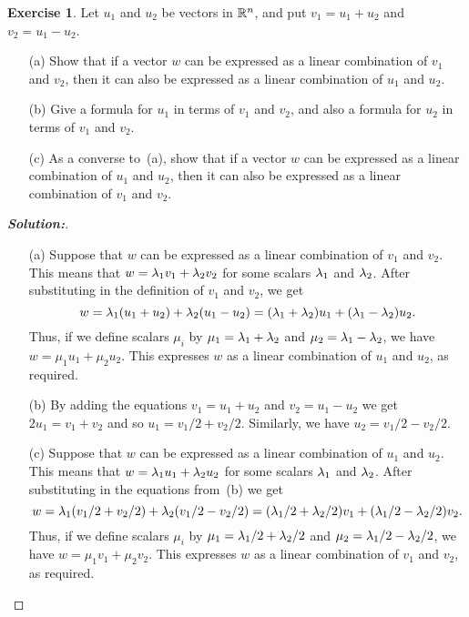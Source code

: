 \documentclass[a4paper]{amsart}
\theoremstyle{definition}
\newtheorem{exercise}{Exercise}
\newenvironment{solution}{\begin{proof}[\textbf{Solution:}] \vphantom{u}}{\end{proof}}
\begin{document}
\begin{exercise}\label{ex-combination-v}
 Let $u_1$ and $u_2$ be vectors in ${\mathbb{R}}^n$, and put $v_1=u_1+u_2$ and
 $v_2=u_1-u_2$.  
 \begin{itemize}
  \item[(a)] Show that if a vector $w$ can be expressed as a linear
   combination of $v_1$ and $v_2$, then it can also be expressed as a
   linear combination of $u_1$ and $u_2$.
  \item[(b)] Give a formula for $u_1$ in terms of $v_1$ and $v_2$, and
   also a formula for $u_2$ in terms of $v_1$ and $v_2$.
  \item[(c)] As a converse to~(a), show that if a vector $w$ can be
   expressed as a linear combination of $u_1$ and $u_2$, then it can
   also be expressed as a linear combination of $v_1$ and $v_2$.
 \end{itemize}
\end{exercise}
\begin{solution}
 \begin{itemize}
  \item[(a)] Suppose that $w$ can be expressed as a linear combination
   of $v_1$ and $v_2$.  This means that $w=\lambda_1v_1+\lambda_2v_2$ for some
   scalars $\lambda_1$ and $\lambda_2$.  After substituting in the definition
   of $v_1$ and $v_2$, we get 
   \[ w = \lambda_1(u_1+u_2) + \lambda_2(u_1-u_2) 
        = (\lambda_1+\lambda_2)u_1 + (\lambda_1-\lambda_2)u_2.
   \]
   Thus, if we define scalars $\mu_i$ by $\mu_1=\lambda_1+\lambda_2$ and
   $\mu_2=\lambda_1-\lambda_2$, we have $w=\mu_1u_1+\mu_2u_2$.  This expresses
   $w$ as a linear combination of $u_1$ and $u_2$, as required.
  \item[(b)] By adding the equations $v_1=u_1+u_2$ and $v_2=u_1-u_2$
   we get $2u_1=v_1+v_2$ and so $u_1=v_1/2+v_2/2$.  Similarly, we have
   $u_2=v_1/2-v_2/2$.
  \item[(c)] Suppose that $w$ can be expressed as a linear combination
   of $u_1$ and $u_2$.  This means that $w=\lambda_1u_1+\lambda_2u_2$ for some
   scalars $\lambda_1$ and $\lambda_2$.  After substituting in the equations
   from~(b) we get 
   \[ w = \lambda_1(v_1/2+v_2/2) + \lambda_2(v_1/2-v_2/2) 
        = (\lambda_1/2+\lambda_2/2)v_1 + (\lambda_1/2-\lambda_2/2)v_2.
   \]
   Thus, if we define scalars $\mu_i$ by $\mu_1=\lambda_1/2+\lambda_2/2$ and
   $\mu_2=\lambda_1/2-\lambda_2/2$, we have $w=\mu_1v_1+\mu_2v_2$.  This expresses
   $w$ as a linear combination of $v_1$ and $v_2$, as required.
 \end{itemize}
\end{solution}
\end{document}
